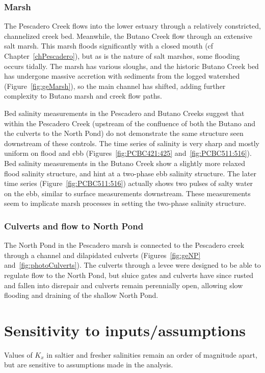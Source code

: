 \subsubsection{Marsh}
The Pescadero Creek flows into the lower estuary through a relatively constricted, channelized creek bed.  Meanwhile, the Butano Creek flow through an extensive salt marsh. This marsh floods significantly with a closed mouth (cf Chapter~\ref{chPescadero}), but as is the nature of salt marshes, some flooding occurs tidally. The marsh has various sloughs, and the historic Butano Creek bed has undergone massive accretion with sediments from the logged watershed (Figure~\ref{fig:geMarsh}), so the main channel has shifted, adding further complexity to Butano marsh and creek flow paths.

Bed salinity measurements in the Pescadero and Butano Creeks suggest that within the Pescadero Creek (upstream of the confluence of both the Butano and the culverts to the North Pond) do not demonstrate the same structure seen downstream of these controls. The time series of salinity is very sharp and mostly uniform on flood and ebb (Figures~\ref{fig:PCBC421:425} and~\ref{fig:PCBC511:516}). Bed salinity measurements in the Butano Creek show a slightly more relaxed flood salinity structure, and hint at a two-phase ebb salinity structure. The later time series (Figure~\ref{fig:PCBC511:516}) actually shows two pulses of salty water on the ebb, similar to surface measurements downstream. These measurements seem to implicate marsh processes in setting the two-phase salinity structure.

\subsubsection{Culverts and flow to North Pond}
The North Pond in the Pescadero marsh is connected to the Pescadero creek through a channel and dilapidated culverts (Figures~\ref{fig:geNP} and~\ref{fig:photoCulverts}). The culverts through a levee were designed to be able to regulate flow to the North Pond, but sluice gates and culverts have since rusted and fallen into disrepair and culverts remain perennially open, allowing slow flooding and draining of the shallow North Pond. 

\section{Sensitivity to inputs/assumptions} \label{sec:Sensitivity}

Values of $K_x$ in saltier and fresher salinities remain an order of magnitude apart, but are sensitive to assumptions made in the analysis.

